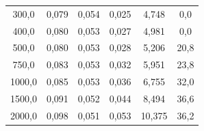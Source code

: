 \documentclass[a4paper, czech]{article}
\begin{document}
\begin{table}[H]
\begin{tabular}{cccccc}
        300,0      & 0,079                                                                       & 0,054                                                                       & 0,025                                                                 & 4,748                                                          & 0,0                                                           \\
        400,0      & 0,080                                                                       & 0,053                                                                       & 0,027                                                                 & 4,981                                                          & 0,0                                                           \\
        500,0      & 0,080                                                                       & 0,053                                                                       & 0,028                                                                 & 5,206                                                          & 20,8                                                          \\
        750,0      & 0,083                                                                       & 0,053                                                                       & 0,032                                                                 & 5,951                                                          & 23,8                                                          \\
        1000,0     & 0,085                                                                       & 0,053                                                                       & 0,036                                                                 & 6,755                                                          & 32,0                                                          \\
        1500,0     & 0,091                                                                       & 0,052                                                                       & 0,044                                                                 & 8,494                                                          & 36,6                                                          \\
        2000,0     & 0,098                                                                       & 0,051                                                                       & 0,053                                                                 & 10,375                                                         & 36,2                                                          \\

\end{tabular}
\end{table}
\end{document}
